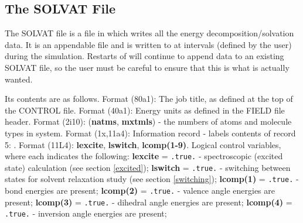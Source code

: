 \subsection{The SOLVAT File}
\label{solvat}

The SOLVAT file is a file in which \D{} writes all the energy
decomposition/solvation data. It is an appendable file and is written to at
intervals (defined by the user) during the simulation. Restarts of \D{} will
continue to append data to an existing SOLVAT file, so the user must be
careful to ensure that this is what is actually wanted.

Its contents are as follows.\newline\newline
{} Format (80a1): The job title, as defined at the top of the
CONTROL file. \newline\newline
{} Format (40a1): Energy units as defined in the FIELD file header. \newline\newline
{} Format (2i10): ({\bf natms}, {\bf mxtmls}) - the
numbers of atoms and molecule types in system.\newline\newline
{} Format (1x,11a4): Information record - labels contents
of record 5: .\newline\newline
{} Format (11L4): {\bf lexcite}, {\bf lswitch}, {\bf
  lcomp(1-9)}. Logical control variables, where each indicates the following:
\newline
{\bf lexcite} = {\tt .true.} - spectroscopic (excited state) calculation (see section \ref{excited});\newline
{\bf lswitch} = {\tt .true.} - switching between states for solvent relaxation
study (see section \ref{switching});\newline
{\bf lcomp(1)} = {\tt .true.} - bond energies are present;\newline
{\bf lcomp(2)} = {\tt .true.} - valence angle energies are present;\newline
{\bf lcomp(3)} = {\tt .true.} - dihedral angle energies are present;\newline
{\bf lcomp(4)} = {\tt .true.} - inversion angle energies are present;\newline
